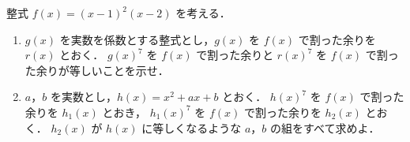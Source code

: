 ﻿\documentclass[../../../uem_mat_tok_q.tex]{subfiles}
\begin{document}
    整式 $f(x)=(x-1)^2(x-2)$ を考える．

    \begin{enumerate}
        \item $g(x)$ を実数を係数とする整式とし，$g(x)$ を $f(x)$ で割った余りを $r(x)$ とおく．%
            $g(x)^7$ を $f(x)$ で割った余りと $r(x)^7$ を $f(x)$ で割った余りが等しいことを示せ．
        \item $a$，$b$ を実数とし，$h(x)=x^2+ax+b$ とおく．%
            $h(x)^7$ を $f(x)$ で割った余りを $h_1(x)$ とおき，%
            $h_1(x)^7$ を $f(x)$ で割った余りを $h_2(x)$ とおく．%
            $h_2(x)$ が $h(x)$ に等しくなるような $a$，$b$ の組をすべて求めよ．
    \end{enumerate}
\end{document}
